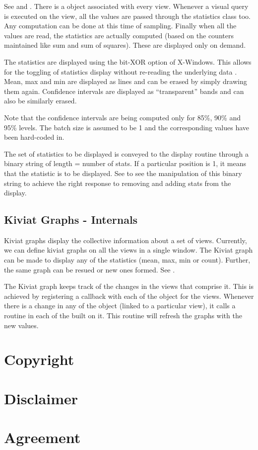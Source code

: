 See  and .  There
is a  object associated with every view. Whenever a
visual query is executed on the view, all the  values
are passed through the statistics class too.  Any computation can be
done at this time of sampling. Finally when all the 
values are read, the statistics are actually computed (based on the
counters maintained like sum and sum of squares). These are displayed
only on demand.

The statistics are displayed using the bit-XOR option of
X-Windows. This allows for the toggling of statistics display without
re-reading the underlying data . Mean, max and min are displayed as
lines and can be erased by simply drawing them again. Confidence
intervals are displayed as ``transparent'' bands and can also be
similarly erased.

Note that the confidence intervals are being computed only for 85\%,
90\% and 95\% levels. The batch size is assumed to be 1 and the
corresponding  values have been hard-coded in.

The set of statistics to be displayed is conveyed to the display
routine through a binary string of length = number of stats. If a
particular position is 1, it means that the statistic is to be
displayed.  See  to see the manipulation of
this binary string to achieve the right response to removing and
adding stats from the display.

\subsection{Kiviat Graphs - Internals}

Kiviat graphs display the collective information about a set of views.
Currently, we can define kiviat graphs on all the views in a single
window.  The Kiviat graph can be made to display any of the statistics
(mean, max, min or count).  Further, the same graph can be resued or
new ones formed. See .

The Kiviat graph keeps track of the changes in the views that comprise
it.  This is achieved by registering a callback with each of the
 object for the views. Whenever there is a change in
any of the  object (linked to a particular view), it
calls a routine in each of the  built on it.  This
routine will refresh the graphs with the new values.

\newpage
\section*{Copyright}



\section*{Disclaimer}



\newpage
\section*{Agreement}




